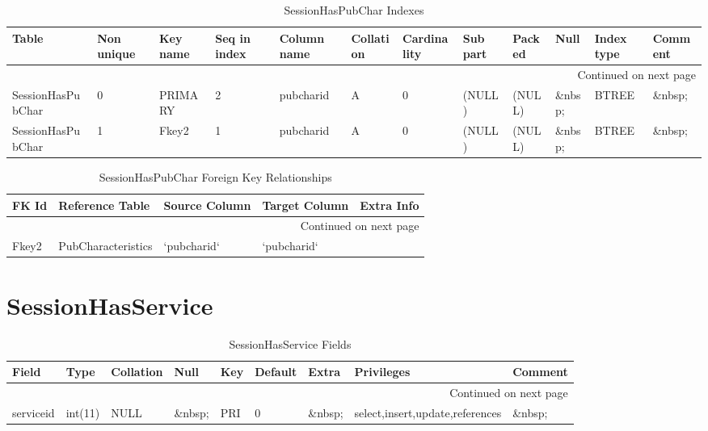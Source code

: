 \documentclass[tablesignature,landscape]{scrartcl}
\begin{document}
\begin{longtable}{|l|l|l|l|l|l|l|l|l|l|l|l|}
\caption{SessionHasPubChar Indexes} \label{tbl:sessionhaspubcharindexes}\\
\hline
 Table              &  Non unique  &  Key name  &  Seq in index  &  Column name  &  Collation  &  Cardinality  &  Sub part  &  Packed  &  Null     &  Index type  &  Comment \\
\hline
\endhead
\hline\multicolumn{12}{r}{Continued on next page}\
\endfoot
\endlastfoot
\hline
 SessionHasPubChar  &           0  &  PRIMARY   &             1  &  sessionid    &  A          &            0  &  (NULL)    &  (NULL)  &  \&nbsp;  &  BTREE       &  \&nbsp;  \\
 SessionHasPubChar  &           0  &  PRIMARY   &             2  &  pubcharid    &  A          &            0  &  (NULL)    &  (NULL)  &  \&nbsp;  &  BTREE       &  \&nbsp;  \\
 SessionHasPubChar  &           1  &  Fkey2     &             1  &  pubcharid    &  A          &            0  &  (NULL)    &  (NULL)  &  \&nbsp;  &  BTREE       &  \&nbsp;  \\
\hline
\end{longtable}


\begin{longtable}{|l|l|l|l|l|}
\caption{SessionHasPubChar Foreign Key Relationships} \label{tbl:sessionhaspubcharfkr}\\
\hline
 FK Id  &  Reference Table     &  Source Column  &  Target Column  &  Extra Info \\
\hline
\endhead
\hline\multicolumn{5}{r}{Continued on next page}\
\endfoot
\endlastfoot
\hline
 Fkey1  &  Sessions            &  `sessionid`    &  `sessionid`    &              \\
 Fkey2  &  PubCharacteristics  &  `pubcharid`    &  `pubcharid`    &              \\
\hline
\end{longtable}
\section{SessionHasService}
\label{sec-28}


\begin{longtable}{|l|l|l|l|l|l|l|l|l|}
\caption{SessionHasService Fields} \label{tbl:sessionhasservicefields}\\
\hline
 Field      &  Type     &  Collation  &  Null     &  Key  &  Default  &  Extra    &  Privileges                       &  Comment \\
\hline
\endhead
\hline\multicolumn{9}{r}{Continued on next page}\
\endfoot
\endlastfoot
\hline
 sessionid  &  int(11)  &  NULL       &  \&nbsp;  &  PRI  &        0  &  \&nbsp;  &  select,insert,update,references  &  \&nbsp;  \\
 serviceid  &  int(11)  &  NULL       &  \&nbsp;  &  PRI  &        0  &  \&nbsp;  &  select,insert,update,references  &  \&nbsp;  \\
\hline
\end{longtable}
\end{document}
